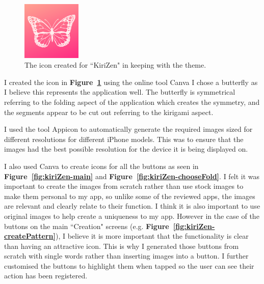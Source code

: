 \documentclass[11pt]{article}
\begin{document}
                \paragraph{}

        \begin{figure}
                        \centering
                        \includegraphics[width=0.25\textwidth]{KiriZen/icon.png}
                        \caption{The icon created for ``KiriZen" in keeping with the theme.}
                        \label{fig:icon}
                    \end{figure}
            I created the icon in \textbf{Figure~\ref{fig:icon}} using the online tool Canva \cite{Canva} I chose a butterfly as I believe this represents the application well. The butterfly is symmetrical referring to the folding aspect of the application which creates the symmetry, and the segments appear to be cut out referring to the kirigami aspect.
            
            I used the tool Appicon \cite{Appicon} to automatically generate the required images sized for different resolutions for different iPhone models. This was to ensure that the images had the best possible resolution for the device it is being displayed on.
        
            I also used Canva to create icons for all the buttons as  seen in \textbf{Figure~\ref{fig:kiriZen-main}} and \textbf{Figure~\ref{fig:kiriZen-chooseFold}}. I felt it was important to create the images from scratch rather than use stock images to make them personal to my app, so unlike some of the reviewed apps, the images are relevant and clearly relate to their function. I think it is also important to use original images to help create a uniqueness to my app. However in the case of the buttons on the main ``Creation" screens (e.g. \textbf{Figure~\ref{fig:kiriZen-createPattern}}), I believe it is more important that the functionality is clear than having an attractive icon. This is why I generated those buttons from scratch with single words rather than inserting images into a button. I further customised the buttons to highlight them when tapped so the user can see their action has been registered.
            
\end{document}
